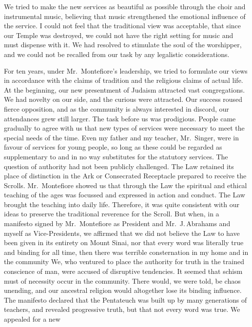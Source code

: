 We tried to make the new services as beautiful as
possible through the choir and instrumental music,
believing that music strengthened the emotional influence
of the service. I could not feel that the traditional view
was acceptable, that since our Temple was destroyed, we
could not have the right setting for music and must
dispense with it. We had resolved to stimulate the soul
of the worshipper, and we could not be recalled from our
task by any legalistic considerations.

For ten years, under Mr.\ Montefiore’s leadership,
we tried to formulate our views in accordance with the
claims of tradition and the religious claims of actual life.
At the beginning, our new presentment of Judaism
attracted vast congregations. We had novelty on our side,
and the curious were attracted. Our success roused fierce
opposition, and as the community is always interested
in discord, our attendances grew still larger. The
task before us was prodigious. People came gradually
to agree with us that new types of services were necessary
to meet the special needs of the time. Even my father
and my teacher, Mr.\ Singer, were in favour of services
for young people, so long as these could be regarded as
supplementary to and in no way substitutes for the
statutory services. The question of authority had not
been publicly challenged. The Law retained its place of
distinction in the Ark or Consecrated Receptacle prepared
to receive the Scrolls. Mr.\ Montefiore showed us
that through the Law the spiritual and ethical teaching
of the ages was focussed and expressed in action and
conduct. The Law brought the teaching into daily
life. Therefore, it was quite consistent with our ideas
to preserve the traditional reverence for the Scroll. But
when, in a manifesto signed by Mr.\ Montefiore as President
and Mr.\ J.\,Abrahams and myself as Vice-Presidents,
we affirmed that we did not believe the Law to have been
given in its entirety on Mount Sinai, nor that every
word was literally true and binding for all time, then
there was terrible consternation in my home and
in the community We, who ventured to place the
authority for truth in the trained conscience of man,
were accused of disruptive tendencies. It seemed
that schism must of necessity occur in the community.
There would, we were told, be chaos
unending, and our ancestral religion would altogether
lose its binding influence. The manifesto declared
that the Pentateuch was built up by many generations
of teachers, and revealed progressive truth, but
that not every word was true. We appealed for a new
